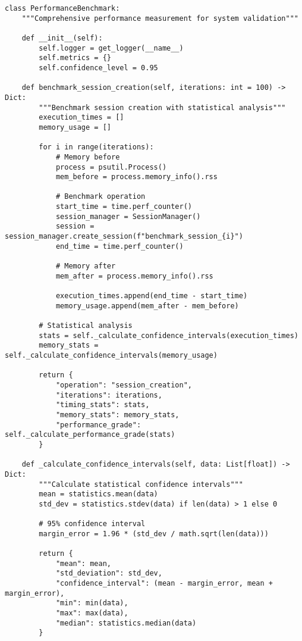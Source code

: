 \documentclass[12pt,a4paper]{article}
\begin{document}
{{\begin{verbatim}
class PerformanceBenchmark:
    """Comprehensive performance measurement for system validation"""
    
    def __init__(self):
        self.logger = get_logger(__name__)
        self.metrics = {}
        self.confidence_level = 0.95
        
    def benchmark_session_creation(self, iterations: int = 100) -> Dict:
        """Benchmark session creation with statistical analysis"""
        execution_times = []
        memory_usage = []
        
        for i in range(iterations):
            # Memory before
            process = psutil.Process()
            mem_before = process.memory_info().rss
            
            # Benchmark operation
            start_time = time.perf_counter()
            session_manager = SessionManager()
            session = session_manager.create_session(f"benchmark_session_{i}")
            end_time = time.perf_counter()
            
            # Memory after
            mem_after = process.memory_info().rss
            
            execution_times.append(end_time - start_time)
            memory_usage.append(mem_after - mem_before)
        
        # Statistical analysis
        stats = self._calculate_confidence_intervals(execution_times)
        memory_stats = self._calculate_confidence_intervals(memory_usage)
        
        return {
            "operation": "session_creation",
            "iterations": iterations,
            "timing_stats": stats,
            "memory_stats": memory_stats,
            "performance_grade": self._calculate_performance_grade(stats)
        }
    
    def _calculate_confidence_intervals(self, data: List[float]) -> Dict:
        """Calculate statistical confidence intervals"""
        mean = statistics.mean(data)
        std_dev = statistics.stdev(data) if len(data) > 1 else 0
        
        # 95% confidence interval
        margin_error = 1.96 * (std_dev / math.sqrt(len(data)))
        
        return {
            "mean": mean,
            "std_deviation": std_dev,
            "confidence_interval": (mean - margin_error, mean + margin_error),
            "min": min(data),
            "max": max(data),
            "median": statistics.median(data)
        }
\end{verbatim}

}}
\end{document}
